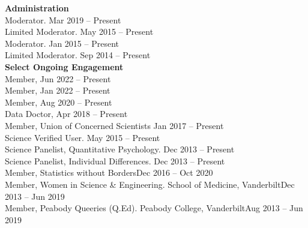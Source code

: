 {\large \textbf{Administration}}\\
Moderator. \hfill{Mar 2019 – Present}\smallskip\\
Limited Moderator. \hfill{May 2015 – Present}\smallskip\\
Moderator. \hfill{Jan 2015 – Present}\smallskip\\
Limited Moderator. \hfill{Sep 2014 – Present}\medskip\\
%
%
{\large \textbf{Select Ongoing Engagement}}\smallskip\\
%
Member,  \hfill{Jun 2022 – Present}\smallskip\\
Member,  \hfill{Jan 2022 – Present}\smallskip\\
Member,  \hfill{Aug 2020 – Present}\smallskip\\
Data Doctor,  \hfill{Apr 2018 – Present}\smallskip\\
Member, Union of Concerned Scientists \hfill{Jan 2017 – Present}\smallskip\\
Science Verified User. \hfill{May 2015 – Present}\smallskip\\
Science Panelist, Quantitative Psychology. \hfill{Dec 2013 – Present}\smallskip\\%
Science Panelist, Individual Differences. \hfill{Dec 2013 – Present}\smallskip\\
Member, Statistics without Borders\hfill{Dec 2016 – Oct 2020}\smallskip\\
Member, Women in Science \& Engineering. School of Medicine, Vanderbilt\hfill{Dec 2013 – Jun 2019}\smallskip\\
Member, Peabody Queeries (Q.Ed). Peabody College, Vanderbilt\hfill{Aug 2013 – Jun 2019}\medskip\\
